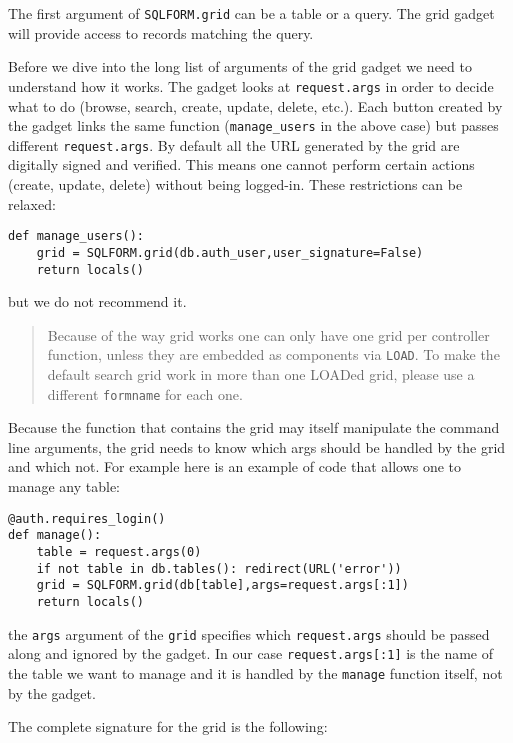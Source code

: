 \documentclass[justified,sixbynine,notoc]{tufte-book}
\def\ft{\small\tt}
\begin{document}
\begin{fullwidth}
The first argument of {\ft SQLFORM.grid} can be a table or a query. The grid gadget will provide access to records matching the query.

Before we dive into the long list of arguments of the grid gadget we need to understand how it works. The gadget looks at {\ft request.args} in order to decide what to do (browse, search, create, update, delete, etc.). Each button created by the gadget links the same function ({\ft manage\_users} in the above case) but passes different {\ft request.args}. By default all the URL generated by the grid are digitally signed and verified. This means one cannot perform certain actions (create, update, delete) without being logged-in. These restrictions can be relaxed:

\begin{lstlisting}
def manage_users():
    grid = SQLFORM.grid(db.auth_user,user_signature=False)
    return locals()
\end{lstlisting}
\noindent but we do not recommend it.

\begin{quote}Because of the way grid works one can only have one grid per controller function, unless they are embedded as components via {\ft LOAD}.
To make the default search grid work in more than one LOADed grid, please use a different {\ft formname} for each one.\end{quote}
Because the function that contains the grid may itself manipulate the command line arguments, the grid needs to know which args should be handled by the grid and which not. For example here is an example of code that allows one to manage any table:

\begin{lstlisting}
@auth.requires_login()
def manage():
    table = request.args(0)
    if not table in db.tables(): redirect(URL('error'))
    grid = SQLFORM.grid(db[table],args=request.args[:1])
    return locals()
\end{lstlisting}
\noindent the {\ft args} argument of the {\ft grid} specifies which {\ft request.args} should be passed along and ignored by the gadget. In our case {\ft request.args[:1]} is the name of the table we want to manage and it is handled by the {\ft manage} function itself, not by the gadget.

The complete signature for the grid is the following:


\end{fullwidth}
\end{document}
